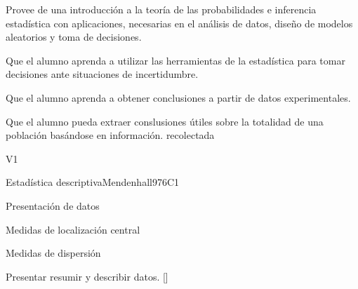 
\begin{syllabus}


\begin{justification}
Provee de una introducción a la teoría de las probabilidades e inferencia estadística con aplicaciones, necesarias en el análisis de datos, diseño de modelos aleatorios y toma de decisiones.
\end{justification}

\begin{goals}
\item Que el alumno aprenda a utilizar las herramientas de la estadística para tomar decisiones ante situaciones de incertidumbre.
\item Que el alumno aprenda a obtener conclusiones a partir de datos experimentales.
\item Que el alumno pueda extraer conslusiones útiles sobre la totalidad de una población basándose en información. recolectada
\end{goals}

\begin{outcomes}{V1}
   \item {}
   \item {}
   \item {}
\end{outcomes}

\begin{competences}
    \item {} 
    \item {}
    \item {}
\end{competences}


\begin{unit}{}{Estadística descriptiva}{Mendenhall97}{6}{C1}
\begin{topics}
      \item Presentación de datos
      \item Medidas de localización central
      \item Medidas de dispersión
   \end{topics}

   \begin{learningoutcomes}
      \item Presentar resumir y describir datos. [\Usage]
   \end{learningoutcomes}
\end{unit}


\end{syllabus}
